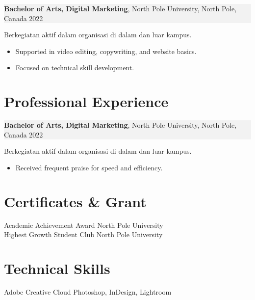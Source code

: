 \documentclass[11pt,a4paper]{article}
\begin{document}
\noindent
\setlength{\fboxsep}{0pt}%
\colorbox[HTML]{F2F2F2}{%
  \parbox{\linewidth}{%
    \textbf{Bachelor of Arts, Digital Marketing}, North Pole University, North Pole, Canada \hfill 2022%
  }%
}
\vspace{0.3em}
Berkegiatan aktif dalam organisasi di dalam dan luar kampus.
\begin{itemize}[left=1.5em, noitemsep, topsep=0pt]
    \item Supported in video editing, copywriting, and website basics.
    \item Focused on technical skill development.
\end{itemize}

\vspace{0.3em}

\section*{Professional Experience}

\noindent
\setlength{\fboxsep}{0pt}%
\colorbox[HTML]{F2F2F2}{%
  \parbox{\linewidth}{%
    \textbf{Bachelor of Arts, Digital Marketing}, North Pole University, North Pole, Canada \hfill 2022%
  }%
}
\vspace{0.3em}
Berkegiatan aktif dalam organisasi di dalam dan luar kampus.
\begin{itemize}[left=1.5em, noitemsep, topsep=0pt]
    \item Received frequent praise for speed and efficiency.
\end{itemize}

\vspace{0.3em}

\section*{Certificates \& Grant}
Academic Achievement Award \hfill North Pole University\\
Highest Growth Student Club \hfill North Pole University

\vspace{0.3em}

\section*{Technical Skills}
Adobe Creative Cloud Photoshop, InDesign, Lightroom
\end{document}
